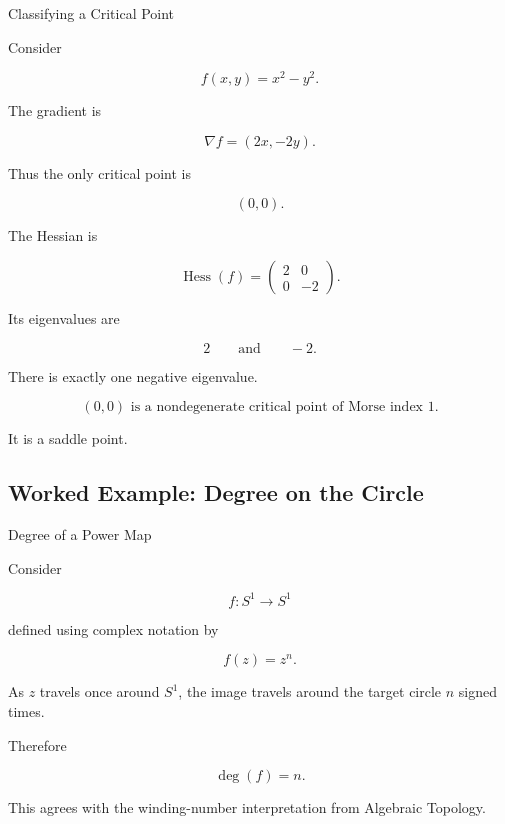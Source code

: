 \begin{workedexamplebox}{Classifying a Critical Point}

Consider

\[
f(x,y)
=
x^2-y^2.
\]

The gradient is

\[
\nabla f
=
(2x,-2y).
\]

Thus the only critical point is

\[
(0,0).
\]

The Hessian is

\[
\operatorname{Hess}(f)
=
\begin{pmatrix}
2&0\\
0&-2
\end{pmatrix}.
\]

Its eigenvalues are

\[
2
\qquad\text{and}\qquad
-2.
\]

There is exactly one negative eigenvalue.

\begin{answerbox}
\[
\boxed{
(0,0)
\text{ is a nondegenerate critical point of Morse index }1.
}
\]

It is a saddle point.
\end{answerbox}
\end{workedexamplebox}

\subsection{Worked Example: Degree on the Circle}
\label{subsec:worked-degree-circle}

\begin{workedexamplebox}{Degree of a Power Map}

Consider

\[
f:S^1\to S^1
\]

defined using complex notation by

\[
f(z)=z^n.
\]

As \(z\) travels once around \(S^1\), the image travels around the target
circle \(n\) signed times.

Therefore

\begin{answerbox}
\[
\boxed{
\deg(f)=n.
}
\]
\end{answerbox}

This agrees with the winding-number interpretation from Algebraic Topology.
\end{workedexamplebox}

